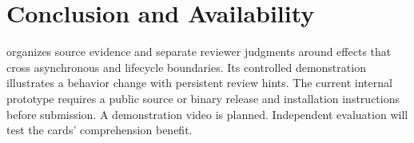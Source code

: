 \section{Conclusion and Availability}
\tool{} organizes source evidence and separate reviewer judgments around effects that cross asynchronous and lifecycle boundaries. Its controlled demonstration illustrates a behavior change with persistent review hints. The current internal prototype requires a public source or binary release and installation instructions before submission. A demonstration video is planned. Independent evaluation will test the cards' comprehension benefit.
